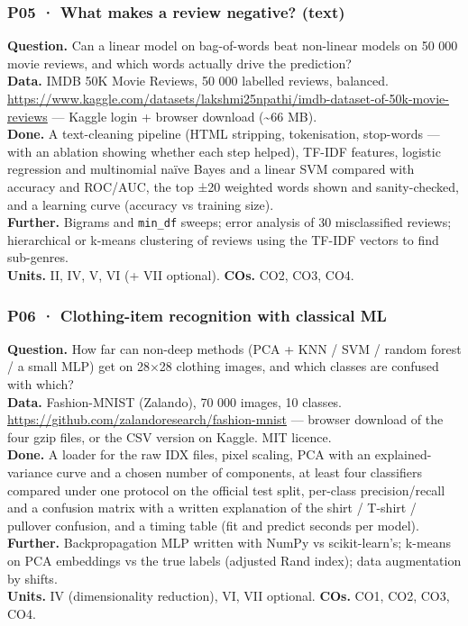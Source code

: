 \documentclass[11pt]{article}
\begin{document}
\hypertarget{p05-what-makes-a-review-negative-text}{%
\subsubsection{P05 · What makes a review negative? (text)}\label{p05-what-makes-a-review-negative-text}}

\textbf{Question.} Can a linear model on bag-of-words beat non-linear models on 50 000 movie reviews, and which words actually drive the prediction?\\
\textbf{Data.} IMDB 50K Movie Reviews, 50 000 labelled reviews, balanced. \url{https://www.kaggle.com/datasets/lakshmi25npathi/imdb-dataset-of-50k-movie-reviews} --- Kaggle login + browser download (\textasciitilde66 MB).\\
\textbf{Done.} A text-cleaning pipeline (HTML stripping, tokenisation, stop-words --- with an ablation showing whether each step helped), TF-IDF features, logistic regression and multinomial naïve Bayes and a linear SVM compared with accuracy and ROC/AUC, the top ±20 weighted words shown and sanity-checked, and a learning curve (accuracy vs training size).\\
\textbf{Further.} Bigrams and \texttt{min\_df} sweeps; error analysis of 30 misclassified reviews; hierarchical or k-means clustering of reviews using the TF-IDF vectors to find sub-genres.\\
\textbf{Units.} II, IV, V, VI (+ VII optional). \textbf{COs.} CO2, CO3, CO4.

\hypertarget{p06-clothing-item-recognition-with-classical-ml}{%
\subsubsection{P06 · Clothing-item recognition with classical ML}\label{p06-clothing-item-recognition-with-classical-ml}}

\textbf{Question.} How far can non-deep methods (PCA + KNN / SVM / random forest / a small MLP) get on 28×28 clothing images, and which classes are confused with which?\\
\textbf{Data.} Fashion-MNIST (Zalando), 70 000 images, 10 classes. \url{https://github.com/zalandoresearch/fashion-mnist} --- browser download of the four gzip files, or the CSV version on Kaggle. MIT licence.\\
\textbf{Done.} A loader for the raw IDX files, pixel scaling, PCA with an explained-variance curve and a chosen number of components, at least four classifiers compared under one protocol on the official test split, per-class precision/recall and a confusion matrix with a written explanation of the shirt / T-shirt / pullover confusion, and a timing table (fit and predict seconds per model).\\
\textbf{Further.} Backpropagation MLP written with NumPy vs scikit-learn's; k-means on PCA embeddings vs the true labels (adjusted Rand index); data augmentation by shifts.\\
\textbf{Units.} IV (dimensionality reduction), VI, VII optional. \textbf{COs.} CO1, CO2, CO3, CO4.
\end{document}
